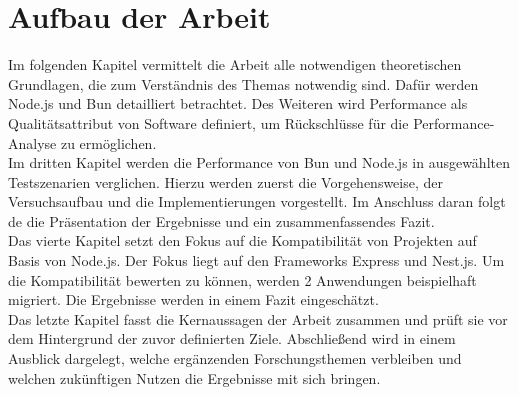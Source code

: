 \section{Aufbau der Arbeit} \label{sec:introduction-overview}
Im folgenden Kapitel vermittelt die Arbeit alle notwendigen theoretischen Grundlagen, die zum Verständnis des Themas notwendig sind. Dafür werden Node.js und Bun detailliert betrachtet. Des Weiteren wird Performance als Qualitätsattribut von Software definiert, um Rückschlüsse für die Performance-Analyse zu ermöglichen.\\

\noindent
Im dritten Kapitel werden die Performance von Bun und Node.js in ausgewählten Testszenarien verglichen. Hierzu werden zuerst die Vorgehensweise, der Versuchsaufbau und die Implementierungen vorgestellt. Im Anschluss daran folgt de die Präsentation der Ergebnisse und ein zusammenfassendes Fazit.\\

\noindent
Das vierte Kapitel setzt den Fokus auf die Kompatibilität von Projekten auf Basis von Node.js. Der Fokus liegt auf den Frameworks Express und Nest.js. Um die Kompatibilität bewerten zu können, werden 2 Anwendungen beispielhaft migriert. Die Ergebnisse werden in einem Fazit eingeschätzt.\\

\noindent
Das letzte Kapitel fasst die Kernaussagen der Arbeit zusammen und prüft sie vor dem Hintergrund der zuvor definierten Ziele. Abschließend wird in einem Ausblick dargelegt, welche ergänzenden Forschungsthemen verbleiben und welchen zukünftigen Nutzen die Ergebnisse mit sich bringen.


